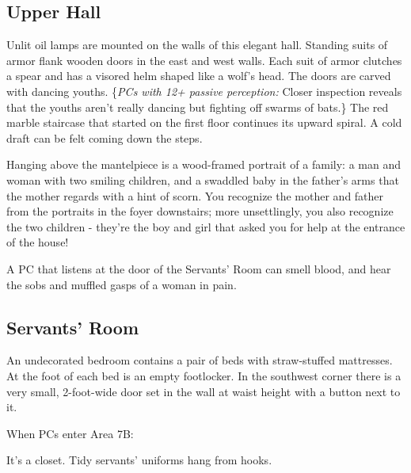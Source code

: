 \pagebreak
\subsection{Upper Hall}
\label{sec:UpperHall}
\begin{readout}
  Unlit oil lamps are mounted on the walls of this elegant hall. Standing suits of armor flank wooden doors in
  the east and west walls. Each suit of armor clutches a spear and has a visored helm shaped like a wolf's head.
  The doors are carved with dancing youths. \{\textit{PCs with 12+ passive perception:} Closer inspection
  reveals that the youths aren't really dancing but fighting off swarms of bats.\} The red marble staircase that
  started on the first floor continues its upward spiral. A cold draft can be felt coming down the steps.
  
  Hanging above the mantelpiece is a wood-framed portrait of a family: a man and woman with two smiling
  children, and a swaddled baby in the father's arms that the mother regards with a hint of scorn. You
  recognize the mother and father from the portraits in the foyer downstairs; more unsettlingly, you also
  recognize the two children - they're the boy and girl that asked you for help at the entrance of the house!
\end{readout}

A PC that listens at the door of the Servants' Room can smell blood, and hear the sobs and muffled gasps of a
woman in pain.

\begin{arealinks}
\end{arealinks}

\pagebreak
\subsection{Servants' Room}
\label{sec:ServantsRoom}
\begin{readout}
  An undecorated bedroom contains a pair of beds with straw-stuffed mattresses. At the foot of each bed is
  an empty footlocker. In the southwest corner there is a very small, 2-foot-wide door set in the wall 
  at waist height with a button next to it.
\end{readout}
When PCs enter Area 7B:
\begin{readout}
  It's a closet. Tidy servants' uniforms hang from hooks.
\end{readout}

